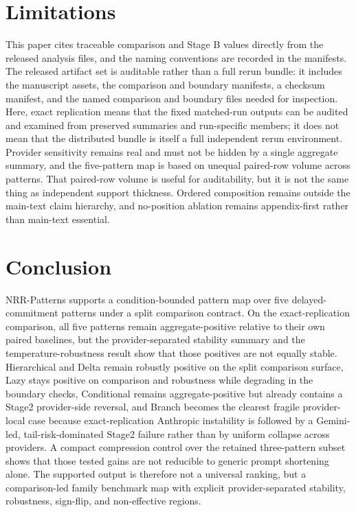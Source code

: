\documentclass[11pt,a4paper]{article}
\begin{document}
\section{Limitations}
\label{sec:limitations}

This paper cites traceable comparison and Stage B values directly from the
released analysis files, and the naming conventions are recorded in the
manifests. The released artifact set is auditable rather than a full rerun
bundle: it includes the manuscript assets, the comparison and boundary
manifests, a checksum manifest, and the named comparison and boundary files
needed for inspection. Here, exact replication means that the fixed matched-run
outputs can be audited and examined from preserved summaries and run-specific
members; it does not mean that the distributed bundle is itself a full
independent rerun environment. Provider sensitivity remains real and must not
be hidden by a single aggregate summary, and the five-pattern map is based on
unequal paired-row volume across patterns. That paired-row volume is useful for
auditability, but it is not the same thing as independent support thickness.
Ordered composition remains outside the main-text claim hierarchy, and
no-position ablation remains appendix-first rather than main-text essential.

\section{Conclusion}
\label{sec:conclusion}

NRR-Patterns supports a condition-bounded pattern map over five delayed-
commitment patterns under a split comparison contract. On the exact-replication
comparison, all five patterns remain aggregate-positive relative to their own
paired baselines, but the provider-separated stability summary and the
temperature-robustness result show that those positives are not equally stable.
Hierarchical and Delta remain robustly positive on the split comparison
surface, Lazy stays positive on comparison and robustness while degrading in
the boundary checks, Conditional remains aggregate-positive but already
contains a Stage2 provider-side reversal, and Branch becomes the clearest
fragile provider-local case because exact-replication Anthropic instability is
followed by a Gemini-led, tail-risk-dominated Stage2 failure rather than by
uniform collapse across providers. A compact compression control over the
retained three-pattern subset shows that those tested gains are not reducible
to generic prompt shortening alone. The supported output is therefore not a
universal ranking, but a comparison-led family benchmark map with explicit
provider-separated stability, robustness, sign-flip, and non-effective
regions.
\end{document}
